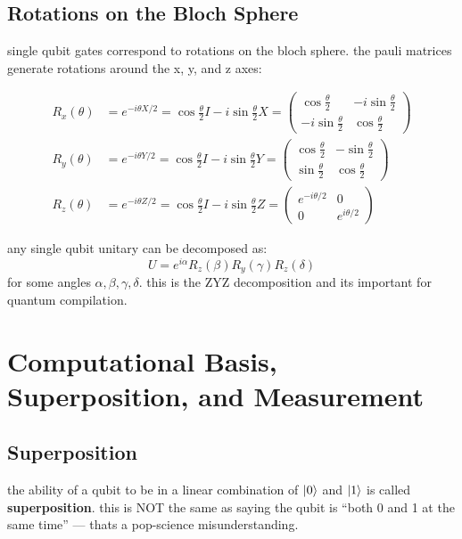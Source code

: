 \documentclass[11pt,a4paper]{article}
\theoremstyle{definition}
\theoremstyle{remark}
\begin{document}
\subsection{Rotations on the Bloch Sphere}

single qubit gates correspond to rotations on the bloch sphere. the pauli matrices generate rotations around the x, y, and z axes:

\begin{align}
R_x(\theta) &= e^{-i\theta X/2} = \cos\frac{\theta}{2}I - i\sin\frac{\theta}{2}X = \begin{pmatrix} \cos\frac{\theta}{2} & -i\sin\frac{\theta}{2} \\ -i\sin\frac{\theta}{2} & \cos\frac{\theta}{2} \end{pmatrix} \\[8pt]
R_y(\theta) &= e^{-i\theta Y/2} = \cos\frac{\theta}{2}I - i\sin\frac{\theta}{2}Y = \begin{pmatrix} \cos\frac{\theta}{2} & -\sin\frac{\theta}{2} \\ \sin\frac{\theta}{2} & \cos\frac{\theta}{2} \end{pmatrix} \\[8pt]
R_z(\theta) &= e^{-i\theta Z/2} = \cos\frac{\theta}{2}I - i\sin\frac{\theta}{2}Z = \begin{pmatrix} e^{-i\theta/2} & 0 \\ 0 & e^{i\theta/2} \end{pmatrix}
\end{align}

any single qubit unitary can be decomposed as:
\[
\boxed{U = e^{i\alpha} R_z(\beta) R_y(\gamma) R_z(\delta)}
\]
for some angles $\alpha, \beta, \gamma, \delta$. this is the ZYZ decomposition and its important for quantum compilation.

\section{Computational Basis, Superposition, and Measurement}

\subsection{Superposition}

the ability of a qubit to be in a linear combination of $\ket{0}$ and $\ket{1}$ is called \textbf{superposition}. this is NOT the same as saying the qubit is ``both 0 and 1 at the same time'' --- thats a pop-science misunderstanding.
\end{document}
